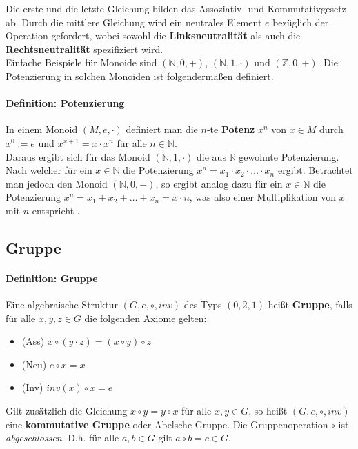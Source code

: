 Die erste und die letzte Gleichung bilden das Assoziativ- und Kommutativgesetz ab. Durch die mittlere Gleichung wird ein neutrales Element $e$ bezüglich der Operation gefordert, wobei sowohl die \textbf{Linksneutralität} als auch die \textbf{Rechtsneutralität} spezifiziert wird.\\

Einfache Beispiele für Monoide sind $(\mathbb{N},0,+)$, $(\mathbb{N},1,\cdot)$ und $(\mathbb{Z},0,+)$. Die Potenzierung in solchen Monoiden ist folgendermaßen definiert.\cite[S. 356]{Berghammer.2021}

\paragraph{Definition: Potenzierung}
In einem Monoid $(M,e,\cdot)$ definiert man die $n$-te \textbf{Potenz} $x^n$ von $x \in M$ durch $x^0 := e$ und $x^{x+1} = x \cdot x^n$ für alle $n \in \mathbb{N}$.\\

Daraus ergibt sich für das Monoid $(\mathbb{N},1,\cdot)$ die aus $\mathbb{R}$ gewohnte Potenzierung. Nach welcher für ein $x \in \mathbb{N}$ die Potenzierung $x^n = x_1 \cdot x_2 \cdot \dots \cdot x_n$ ergibt. Betrachtet man jedoch den Monoid $(\mathbb{N},0,+)$, so ergibt analog dazu für ein $x \in \mathbb{N}$ die Potenzierung $x^n = x_1 + x_2 + \dots + x_n = x \cdot n$, was also einer Multiplikation von $x$ mit $n$ entspricht \cite[S. 356, 357]{Berghammer.2021}.

\subsection{Gruppe}\label{sec:gruppe}

\paragraph{Definition: Gruppe}
Eine algebraische Struktur $(G,e,\circ,inv)$ des Typs $(0,2,1)$ heißt \textbf{Gruppe}, falls für alle $x,y,z \in G$ die folgenden Axiome gelten:

\begin{itemize}
    \item (Ass)    $x \circ (y \cdot z) = (x \circ y) \circ z$
    \item (Neu)    $e \circ x = x$
    \item (Inv)    $inv(x) \circ x = e$
\end{itemize}

Gilt zusätzlich die Gleichung $x \circ y = y \circ x$ für alle $x,y \in G$, so heißt $(G,e,\circ,inv)$ eine \textbf{kommutative Gruppe} oder Abelsche Gruppe. Die Gruppenoperation $\circ$ ist \textit{abgeschlossen}. D.h. für alle $a,b \in G$ gilt $a \circ b = c \in G$.

